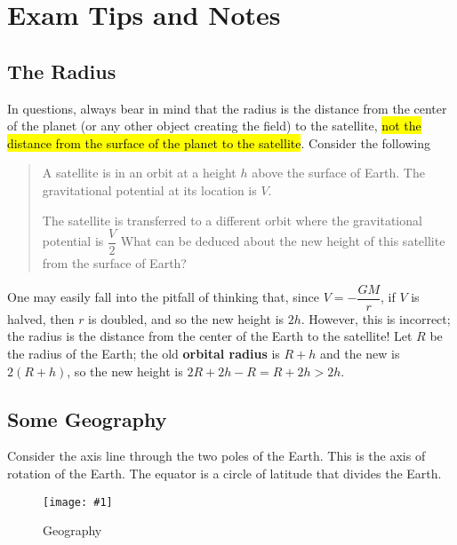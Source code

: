 \documentclass[a4paper,12pt]{article}
\let\oldsection\section
\renewcommand\section{\clearpage\oldsection}
\newcommand{\img}[4]{\begin{center}
  \begin{figure}[H]
    \centering
    \texttt{[image: \#1]}
    \caption{#3}
    \label{fig:#4}
  \end{figure}
\end{center}}
\begin{document}
\pagebreak

\section{Exam Tips and Notes}

\subsection{The Radius}

In questions, always bear in mind that the radius is the distance from the center of the planet (or any other object creating the field) to the satellite, \hl{not the distance from the surface of the planet to the satellite}. Consider the following
\begin{quote}
  A satellite is in an orbit at a height $h$ above the surface of Earth. The gravitational potential at its location is $V$.

  The satellite is transferred to a different orbit where the gravitational potential is $\dfrac{V}{2}$ What can be deduced about the new height of this satellite from the surface of Earth?
\end{quote}
One may easily fall into the pitfall of thinking that, since $V = -\dfrac{GM}{r}$, if $V$ is halved, then $r$ is doubled, and so the new height is $2h$. However, this is incorrect; the radius is the distance from the center of the Earth to the satellite! Let $R$ be the radius of the Earth; the old \textbf{orbital radius} is $R + h$ and the new is $2(R + h)$, so the new height is $2R + 2h - R = R + 2h > 2h$.

\subsection{Some Geography}

Consider the axis line through the two poles of the Earth. This is the axis of rotation of the Earth. The equator is a circle of latitude that divides the Earth.

\img{equator.png}{0.4}{Geography}{equator}
\end{document}
